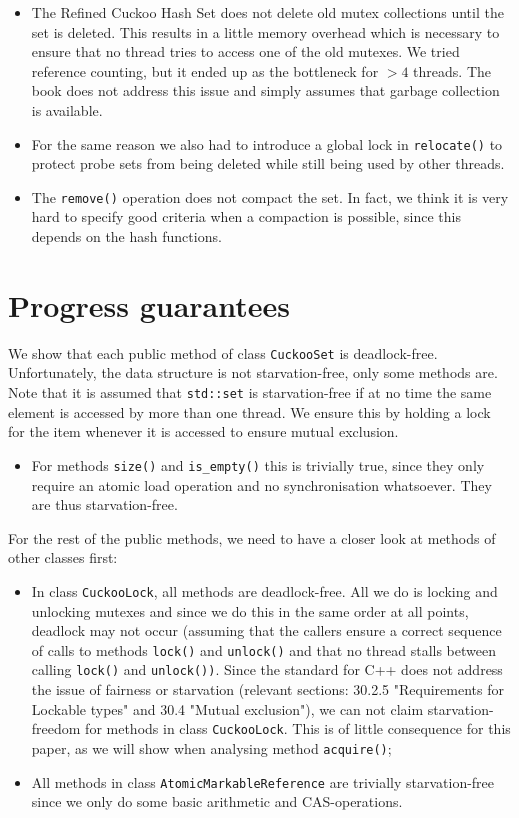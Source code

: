 \documentclass[a4paper,10pt]{article}
\begin{document}
\begin{itemize}
\item The Refined Cuckoo Hash Set does not delete old mutex collections until the set is deleted. This results in a little memory overhead which is necessary to ensure that no thread tries to access one of the old mutexes. We tried reference counting, but it ended up as the bottleneck for $>4$ threads. The book does not address this issue and simply assumes that garbage collection is available.
\item For the same reason we also had to introduce a global lock in \lstinline|relocate()| to protect probe sets from being deleted while still being used by other threads.
\item The \lstinline|remove()| operation does not compact the set. In fact, we think it is very hard to specify good criteria when a compaction is possible, since this depends on the hash functions.

\end{itemize}

\section{Progress guarantees}
\label{sec:progressGuarantees}
We show that each public method of class \lstinline|CuckooSet| is deadlock-free. Unfortunately, the data structure is not starvation-free, only some methods are. Note that it is assumed that \lstinline|std::set| is starvation-free if at no time the same element is accessed by more than one thread. We ensure this by holding a lock for the item whenever it is accessed to ensure mutual exclusion.
\begin{itemize}
\item For methods \lstinline|size()| and \lstinline|is_empty()| this is trivially true, since they only require an atomic load operation and no synchronisation 
whatsoever. They are thus starvation-free.
\end{itemize}
For the rest of the public methods, we need to have a closer look at methods of other classes first:
\begin{itemize}
\item In class \lstinline|CuckooLock|, all methods are deadlock-free. All we do is locking and unlocking mutexes and since we do this in the same order at all points, deadlock may not occur (assuming that the callers ensure a correct sequence of calls to methods \lstinline|lock()| and \lstinline|unlock()| and that no thread stalls between calling \lstinline|lock()| and \lstinline|unlock())|. 
\newline
Since the standard for C++ \cite{cppstandard} does not address the issue of fairness or starvation (relevant sections: 30.2.5 "Requirements for Lockable types" and 30.4 "Mutual exclusion"), we can not claim starvation-freedom for methods in class \lstinline|CuckooLock|. This is of little consequence for this paper, as we will show when analysing method \lstinline|acquire()|;
\item All methods in class \lstinline|AtomicMarkableReference| are trivially starvation-free since we only do some basic arithmetic and CAS-operations.
\end{itemize}
\end{document}
